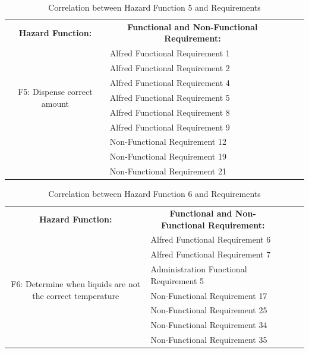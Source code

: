 \documentclass [10pt]{article}
\begin{document}
\begin{table}
\centering
\begin{tabular}{|c|l|lll}
\cline{1-2}
\textbf{Hazard Function:} & \multicolumn{1}{c|}{\textbf{Functional and Non-Functional Requirement:}} &  &  &  \\ \cline{1-2}
\multirow{7}{*}{F5: Dispense correct amount} 
				& Alfred Functional Requirement 1	&  &  &  \\ \cline{2-2}
                                  & Alfred Functional Requirement 2	&  &  &  \\ \cline{2-2}
                                  & Alfred Functional Requirement 4	&  &  &  \\ \cline{2-2}
                                  & Alfred Functional Requirement 5	&  &  &  \\ \cline{2-2}
                                  & Alfred Functional Requirement 8	&  &  &  \\ \cline{2-2}
                                  & Alfred Functional Requirement 9	&  &  &  \\ \cline{2-2}
                                  & Non-Functional Requirement 12	&  &  &  \\ \cline{2-2}
                                  & Non-Functional Requirement 19	&  &  &  \\ \cline{2-2}
                                  & Non-Functional Requirement 21	&  &  &  \\ \cline{1-2}
\end{tabular}
\caption{Correlation between Hazard Function 5 and Requirements}  
\end{table}




\begin{table}
\centering
\begin{tabular}{|c|l|lll}
\cline{1-2}
\textbf{Hazard Function:} & \multicolumn{1}{c|}{\textbf{Functional and Non-Functional Requirement:}} &  &  &  \\ \cline{1-2}
\multirow{7}{*}{F6: Determine when liquids are not the correct temperature} 
				      & Alfred Functional Requirement 6	&  &  &  \\ \cline{2-2}
                                        & Alfred Functional Requirement 7	&  &  &  \\ \cline{2-2}
                                        & Administration Functional Requirement 5	&  &  &  \\ \cline{2-2}
                                        & Non-Functional Requirement 17	&  &  &  \\ \cline{2-2}
                                        & Non-Functional Requirement 25	&  &  &  \\ \cline{2-2}
                                        & Non-Functional Requirement 34	&  &  &  \\ \cline{2-2}
                                        & Non-Functional Requirement 35	&  &  &  \\ \cline{1-2}
\end{tabular}
\caption{Correlation between Hazard Function 6 and Requirements}  
\end{table}
\end{document}
